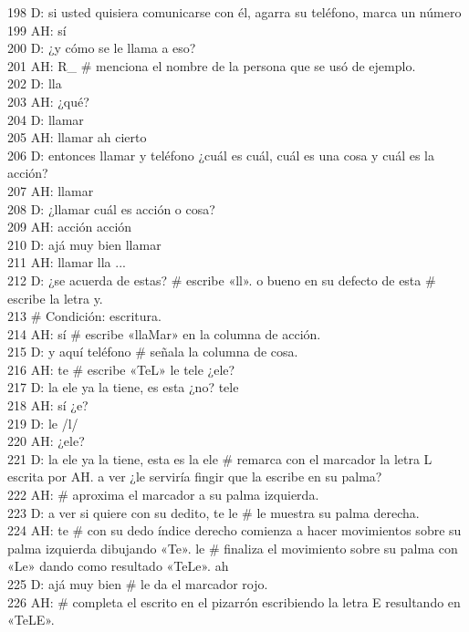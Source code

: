 198 D: si usted quisiera comunicarse con él, agarra su teléfono, marca un número\\
199 AH: sí\\
200 D: ¿y cómo se le llama a eso?\\
201 AH: R\_ \# menciona el nombre de la persona que se usó de ejemplo.\\
202 D: lla\\
203 AH: ¿qué?\\
204 D: llamar\\
205 AH: llamar ah cierto\\
206 D: entonces llamar y teléfono ¿cuál es cuál, cuál es una cosa y cuál es la acción?\\
207 AH: llamar\\
208 D: ¿llamar cuál es acción o cosa?\\
209 AH: acción acción\\
210 D: ajá muy bien llamar\\
211 AH: llamar lla ...\\
212 D: ¿se acuerda de estas? \# escribe «ll». o bueno en su defecto de esta \# escribe la letra y.\\
213 \# Condición: escritura.\\
214 AH: sí \# escribe «llaMar» en la columna de acción.\\
215 D: y aquí teléfono \# señala la columna de cosa.\\
216 AH: te \# escribe «TeL» le tele ¿ele?\\
217 D: la ele ya la tiene, es esta ¿no? tele\\
218 AH: sí ¿e?\\
219 D: le /l/\\
220 AH: ¿ele?\\
221 D: la ele ya la tiene, esta es la ele \# remarca con el marcador la letra L escrita por AH. a ver ¿le serviría fingir que la escribe en su palma?\\
222 AH: \# aproxima el marcador a su palma izquierda.\\
223 D: a ver si quiere con su dedito, te le \# le muestra su palma derecha.\\
224 AH: te \# con su dedo índice derecho comienza a hacer movimientos sobre su palma izquierda dibujando «Te». le \# finaliza el movimiento sobre su palma con «Le» dando como resultado\label{resulado} «TeLe». ah\\
225 D: ajá muy bien \# le da el marcador rojo.\\
226 AH: \# completa el escrito en el pizarrón escribiendo la letra E resultando en «TeLE».\\
